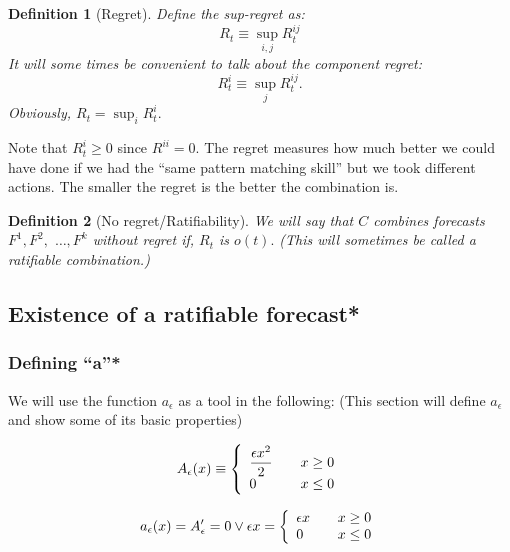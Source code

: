 \documentclass{book}
\newtheorem{definition}{Definition}[chapter]
\begin{document}
\begin{definition}[Regret]   Define the sup-regret as:
  \begin{equation}
    R_t \equiv \sup_{i,j} R^{ij}_t
    \label{eqn:MaxRegret}
  \end{equation}
  It will some times be convenient to talk about the component
  regret: 
\begin{displaymath}
R^i_t \equiv \sup_{j} R^{ij}_t.
\end{displaymath}
Obviously, $R_t = \sup_i
  R^i_t.$
\end{definition}
Note that $R^i_t \ge 0$ since $R^{ii} = 0$.  The regret
measures how much better we could have done if we had the ``same
pattern matching skill'' but we took different actions.  The smaller
the regret is the better the combination is.

\begin{definition}[No regret/Ratifiability] We will say that $C$
  combines forecasts $F^1,F^2,$ $\ldots,F^k$ without regret if, $R_t$
  is $o(t).$  (This will sometimes be called a ratifiable combination.)
\end{definition}
 
        \subsection{Existence of a ratifiable forecast*}
           \subsubsection{Defining ``a''*}
%

We will use the function $a_\epsilon$ as a tool in the following: (This
section will define $a_\epsilon$ and show some of its basic properties)

\begin{equation}
  A_\epsilon(x) \equiv \left\{ 
  \begin{array}{l@{\qquad}l}
    \displaystyle
    \frac{\epsilon x^2}{2}  & \displaystyle x \ge 0 \\
    0                                               & x \le 0
  \end{array}
  \right.  
  \label{defA}
\end{equation}

\begin{equation}
  a_\epsilon(x) = A_\epsilon' = 0 \vee \epsilon x = \left\{ 
  \begin{array}{l@{\qquad}l}
    \epsilon x            & x \ge 0 \\
    0                           & x \le 0
  \end{array}
  \right.  
  \label{eqn:A'}
\end{equation}
\end{document}
